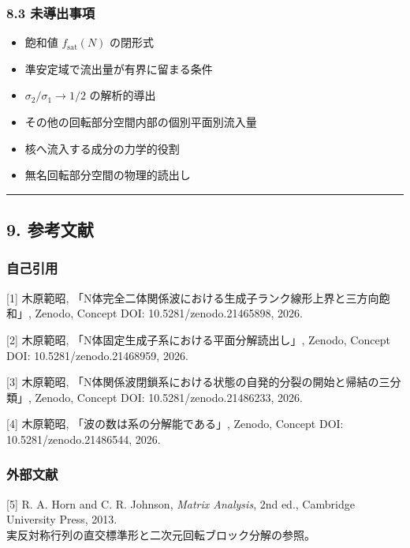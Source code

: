 \documentclass[
  a4paper,
]{ltjsarticle}
\providecommand{\tightlist}{%
  \setlength{\itemsep}{0pt}\setlength{\parskip}{0pt}}
\begin{document}
\subsubsection{8.3 未導出事項}\label{ux672aux5c0eux51faux4e8bux9805}

\begin{itemize}
\tightlist
\item
  飽和値 \(f_{\mathrm{sat}}(N)\) の閉形式
\item
  準安定域で流出量が有界に留まる条件
\item
  \(\sigma_2/\sigma_1\to1/2\) の解析的導出
\item
  その他の回転部分空間内部の個別平面別流入量
\item
  核へ流入する成分の力学的役割
\item
  無名回転部分空間の物理的読出し
\end{itemize}

\begin{center}\rule{0.5\linewidth}{0.5pt}\end{center}

\subsection{9. 参考文献}\label{ux53c2ux8003ux6587ux732e}

\subsubsection{自己引用}\label{ux81eaux5df1ux5f15ux7528}

{[}1{]} 木原範昭,
「N体完全二体関係波における生成子ランク線形上界と三方向飽和」, Zenodo,
Concept DOI: 10.5281/zenodo.21465898, 2026.

{[}2{]} 木原範昭, 「N体固定生成子系における平面分解読出し」, Zenodo,
Concept DOI: 10.5281/zenodo.21468959, 2026.

{[}3{]} 木原範昭,
「N体関係波閉鎖系における状態の自発的分裂の開始と帰結の三分類」, Zenodo,
Concept DOI: 10.5281/zenodo.21486233, 2026.

{[}4{]} 木原範昭, 「波の数は系の分解能である」, Zenodo, Concept DOI:
10.5281/zenodo.21486544, 2026.

\subsubsection{外部文献}\label{ux5916ux90e8ux6587ux732e}

{[}5{]} R. A. Horn and C. R. Johnson, \emph{Matrix Analysis}, 2nd ed.,
Cambridge University Press, 2013.\\
実反対称行列の直交標準形と二次元回転ブロック分解の参照。
\end{document}

